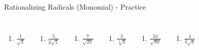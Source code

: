 \documentclass[aspectratio=169]{beamer}
\begin{document}
\begin{frame}{Rationalizing Radicals (Monomial) - Practice}
\begin{tcolorbox}[colback=lightgray,colframe=accent,title=Practice Problems]
\footnotesize
\begin{columns}[T]
\begin{enumerate}[label=3\textbf{a})]
  \item $\frac{1}{\sqrt{3}}$
\end{enumerate}
\begin{enumerate}[label=3\textbf{b})]
  \item $\frac{5}{2\sqrt{5}}$
\end{enumerate}
\begin{enumerate}[label=3\textbf{c})]
  \item $\frac{7}{\sqrt{2x}}$
\end{enumerate}
\begin{enumerate}[label=3\textbf{d})]
  \item $\frac{3}{\sqrt[3]{4}}$
\end{enumerate}
\begin{enumerate}[label=3\textbf{e})]
  \item $\frac{2x}{\sqrt{8x}}$
\end{enumerate}
\begin{enumerate}[label=3\textbf{f})]
  \item $\frac{4}{2\sqrt{y}}$
\end{enumerate}
\end{columns}
\end{tcolorbox}
\end{frame}
\end{document}
